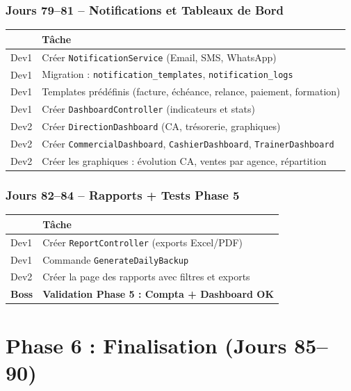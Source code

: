 \documentclass[12pt,a4paper]{report}
\begin{document}
\subsection*{Jours 79--81 -- Notifications et Tableaux de Bord}

\begin{tabularx}{\textwidth}{l X}
    \toprule
    & \textbf{Tâche} \\
    \midrule
    Dev1 & Créer \texttt{NotificationService} (Email, SMS, WhatsApp) \\
    Dev1 & Migration : \texttt{notification\_templates}, \texttt{notification\_logs} \\
    Dev1 & Templates prédéfinis (facture, échéance, relance, paiement, formation) \\
    Dev1 & Créer \texttt{DashboardController} (indicateurs et stats) \\
    Dev2 & Créer \texttt{DirectionDashboard} (CA, trésorerie, graphiques) \\
    Dev2 & Créer \texttt{CommercialDashboard}, \texttt{CashierDashboard}, \texttt{TrainerDashboard} \\
    Dev2 & Créer les graphiques : évolution CA, ventes par agence, répartition \\
    \bottomrule
\end{tabularx}

\subsection*{Jours 82--84 -- Rapports + Tests Phase 5}

\begin{tabularx}{\textwidth}{l X}
    \toprule
    & \textbf{Tâche} \\
    \midrule
    Dev1 & Créer \texttt{ReportController} (exports Excel/PDF) \\
    Dev1 & Commande \texttt{GenerateDailyBackup} \\
    Dev2 & Créer la page des rapports avec filtres et exports \\
    \textbf{Boss} & \textbf{Validation Phase 5 : Compta + Dashboard OK} \\
    \bottomrule
\end{tabularx}

\chapter{Phase 6 : Finalisation (Jours 85--90)}
\end{document}
